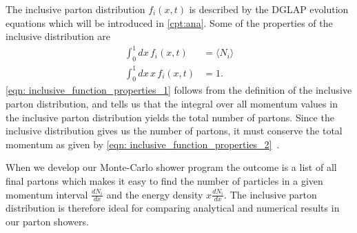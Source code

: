 \documentclass[main.tex]{subfiles}
\begin{document}
The inclusive parton distribution \(f_i(x,t)\) is described by the DGLAP evolution equations which will be introduced in \autoref{cpt:ana}. Some of the properties of the inclusive distribution are
\begin{align}
    \int_0^1 dx\, f_i(x,t) &= \langle N_{i}\rangle  \label{eqn: inclusive_function_properties_1}\\
    \int_0^1 dx\, x\,  f_i(x,t) &= 1. \label{eqn: inclusive_function_properties_2}
\end{align}
\autoref{eqn: inclusive_function_properties_1} follows from the definition of the inclusive parton distribution, and tells us that the integral over all momentum values in the inclusive parton distribution yields the total number of partons. Since the inclusive distribution gives us the number of partons, it must conserve the total momentum as given by \autoref{eqn: inclusive_function_properties_2}~\cite{Neill_2021}.

When we develop our Monte-Carlo shower program the outcome is a list of all final partons which makes it easy to find the number of particles in a given momentum interval \(\frac{dN_i}{dx}\) and the energy density \(x \frac{dN_i}{dx}\). The inclusive parton distribution is therefore ideal for comparing analytical and numerical results in our parton showers.
\end{document}

